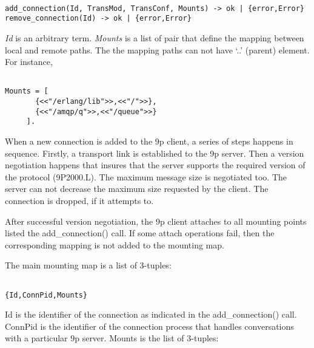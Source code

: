 \begin{adjustwidth}{2.5em}{2.5em}
\begin{verbatim}

add_connection(Id, TransMod, TransConf, Mounts) -> ok | {error,Error}
remove_connection(Id) -> ok | {error,Error}

\end{verbatim}
\end{adjustwidth}

\emph{Id} is an arbitrary term. \emph{Mounts} is a list of pair that define the
mapping between local and remote paths. The the mapping paths can not have
`..' (parent) element. For instance,

\begin{adjustwidth}{2.5em}{2.5em}
\begin{verbatim}

Mounts = [
       {<<"/erlang/lib">>,<<"/">>},
       {<<"/amqp/q">>,<<"/queue">>}
     ].

\end{verbatim}
\end{adjustwidth}

When a new connection is added to the 9p client, a series of steps happens in
sequence. Firstly, a transport link is established to the 9p server. Then a
version negotiation happens that insures that the server supports the required
version of the protocol (9P2000.L). The maximum message size is negotiated too.
The server can not decrease the maximum size requested by the client. The
connection is dropped, if it attempts to.

After successful version negotiation, the 9p client attaches to all mounting
points listed the add\_connection() call. If some attach operations fail,
then the corresponding mapping is not added to the mounting map.

The main mounting map is a list of 3-tuples:

\begin{adjustwidth}{2.5em}{2.5em}
\begin{verbatim}

{Id,ConnPid,Mounts}

\end{verbatim}
\end{adjustwidth}

Id is the identifier of the connection as indicated in the
add\_connection() call. ConnPid is the identifier of the connection
process that handles conversations with a particular 9p server. Mounts is the
list of 3-tuples:

